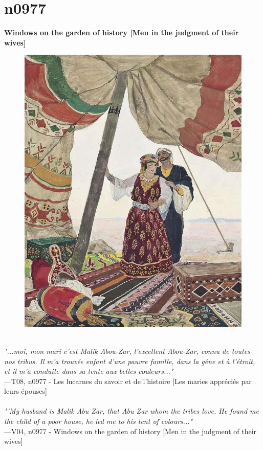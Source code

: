 \documentclass[../Carre_nights.tex]{subfiles}
\begin{document}
\newpage

\section{n0977}
\textbf{\Large{Windows on the garden of history [Men in the judgment of their wives]}} \\

\begin{figure}[ht]
\centering
\includegraphics[height=\figsize]{illustrations/volume_8/T08, n0977 - Les lucarnes du savoir et de l'histoire [Les maries appréciés par leurs épouses].jpg}
\end{figure}

\textit{\\
"...moi, mon mari c’est Malik Abou-Zar, l’excellent Abou-Zar, connu de toutes nos tribus. Il m’a trouvée enfant d’une pauvre famille, dans la gêne et à l’étroit, et il m’a conduite dans sa tente aux belles couleurs..."} \\
—T08, n0977 - Les lucarnes du savoir et de l'histoire [Les maries appréciés par leurs épouses] \\~\\
\textit{"'My husband is Malik Abu Zar, that Abu Zar whom the tribes love. He found me the child of a poor house, he led me to his tent of colours..."} \\
—V04, n0977 - Windows on the garden of history [Men in the judgment of their wives]
\end{document}
